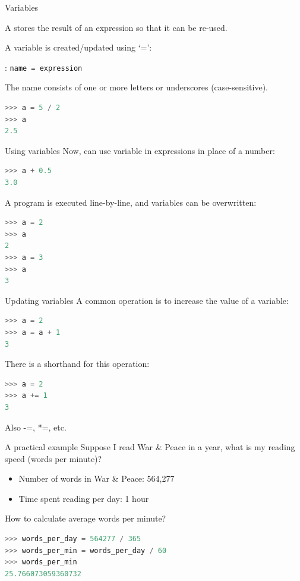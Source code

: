 \documentclass{beamer}
\begin{document}
\begin{frame}[fragile]{Variables}
    \begin{definition}
        A  stores the result of an expression
        so that it can be re-used.
    \end{definition}

A variable is created/updated using `=':

\begin{definition}
: \texttt{name = expression}

The name consists of one or more letters or underscores (case-sensitive).
\end{definition}

\begin{lstlisting}[language=python]
>>> a = 5 / 2
>>> a
2.5
\end{lstlisting}
\end{frame}

\begin{frame}[fragile]{Using variables}
Now, can use variable in expressions in place of a number:

\begin{lstlisting}[language=python]
>>> a + 0.5
3.0
\end{lstlisting}

\pause
A program is executed line-by-line, and variables can be overwritten:
\begin{lstlisting}[language=python]
>>> a = 2
>>> a
2
>>> a = 3
>>> a
3
\end{lstlisting}
\end{frame}


\begin{frame}[fragile]{Updating variables}
A common operation is to increase the value of a variable:
\begin{lstlisting}[language=python]
>>> a = 2
>>> a = a + 1
3
\end{lstlisting}

\pause
There is a shorthand for this operation:
\begin{lstlisting}[language=python]
>>> a = 2
>>> a += 1
3
\end{lstlisting}

Also -=, *=, etc.
\end{frame}


\begin{frame}[fragile]{A practical example}
    Suppose I read War \& Peace in a year,
    what is my reading speed (words per minute)?
    \begin{itemize}
        \item Number of words in War \& Peace: 564,277
        \item Time spent reading per day: 1 hour
    \end{itemize}
    How to calculate average words per minute?
    \pause

\begin{lstlisting}[language=python]
>>> words_per_day = 564277 / 365
>>> words_per_min = words_per_day / 60
>>> words_per_min
25.766073059360732
\end{lstlisting}
\end{frame}
\end{document}
